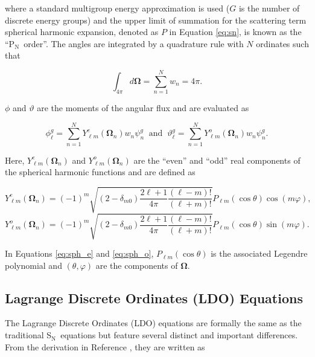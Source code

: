 \documentclass{article} %
\newcommand{\bo}{\mathbf\Omega}
\newcommand{\sn}{S$_\mathrm{N}$}
\newcommand{\pn}{P$_\mathrm{N}$}
\newcommand{\Ye}[2]{\ensuremath{Y^e_{#1}(\bo_#2)}}
\newcommand{\Yo}[2]{\ensuremath{Y^o_{#1}(\bo_#2)}}
\begin{document}
\noindent where a standard multigroup energy approximation is used ($G$ is the 
number of discrete energy groups) and the 
upper limit of summation for the scattering term spherical harmonic expansion,
denoted as $P$ in Equation \ref{eq:sn}, is known as the ``\pn\ order''. The
angles are integrated by a quadrature rule with $N$ ordinates such that

\begin{equation}
\int_{4\pi} d\bo = \sum_{n=1}^{N}w_n = 4\pi.
\label{eq:quadrule}
\end{equation}

\noindent $\phi$ and $\vartheta$ are the moments of the angular flux and are
evaluated as

\begin{equation}
\phi_{\ell}^{g}=\sum_{n=1}^N \Ye{\ell m}{n}w_n\psi^{g}_{n}\
\text{ and }\
\vartheta_{\ell}^{g} = \sum_{n=1}^N \Yo{\ell m}{n}w_n\psi^{g}_{n}.
\label{sph_harm_exp}
\end{equation}

\noindent Here, $\Ye{\ell m}{n}$ and $\Yo{\ell m}{n}$ are the ``even'' and
``odd'' real components of the spherical harmonic functions and are defined as

\begin{equation}
\Ye{\ell m}{n} = (-1)^m\sqrt{(2-\delta_{m0})\frac{2\ell+1}{4\pi}
                       \frac{(\ell-m)!}{(\ell+m)!}}
                       P_{\ell m}(\cos\theta)\cos(m\varphi),
\label{eq:sph_e}
\end{equation}
\begin{equation}
\Yo{\ell m}{n} = (-1)^m\sqrt{(2-\delta_{m0})\frac{2\ell+1}{4\pi}
                       \frac{(\ell-m)!}{(\ell+m)!}}
                       P_{\ell m}(\cos\theta)\sin(m\varphi).
\label{eq:sph_o}
\end{equation}

\noindent In Equations \ref{eq:sph_e} and \ref{eq:sph_o},
$P_{\ell m}(\cos\theta)$ is the associated Legendre polynomial and
$(\theta,\varphi)$ are the components of $\bo$.

\subsection{Lagrange Discrete Ordinates (LDO) Equations}

The Lagrange Discrete Ordinates (LDO) equations are formally the same as the
traditional \sn\ equations but feature several distinct and important
differences. From the derivation in Reference \cite{ahrens}, they are written
as
\end{document}
